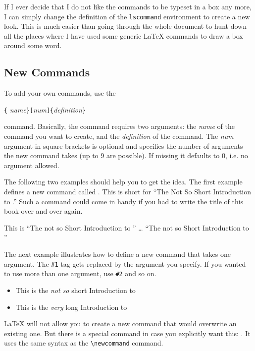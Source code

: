 If I ever decide that I do not like the commands to be typeset in
a box any more, I can simply change the definition of the
\texttt{lscommand} environment to create a new look. This is much
easier than going through the whole document to hunt down all the
places where I have used some generic \LaTeX{} commands to draw a
box around some word. 


\subsection{New Commands}

To add your own commands, use the
\begin{lscommand}
\verb|{|%
       \emph{name}\verb|}[|\emph{num}\verb|]{|\emph{definition}\verb|}|
\end{lscommand}
\noindent command. 
Basically, the command requires two arguments: the \emph{name} of the
command you want to create, and the \emph{definition} of the command.
The \emph{num} argument in square brackets is optional and specifies the number
of arguments the new command takes (up to 9 are possible).
If missing it defaults to 0, i.e. no argument allowed.

The following two examples should help you to get the idea.
The first example defines a new command called . This is
short for ``The Not So Short Introduction to \LaTeXe.'' Such a command
could come in handy if you had to write the title of this book over 
and over again. 

\begin{example}
\newcommand{\tnss}{The not
    so Short Introduction to
    \LaTeXe}
This is ``\tnss'' \ldots{} 
``\tnss''
\end{example}

The next example illustrates how to define a new
command that takes one argument.
The \verb|#1| tag gets replaced by the argument you specify.
If you wanted to use more than one argument, use \verb|#2| and
so on.

\begin{example}
\newcommand{\txsit}[2]
 {This is the \emph{#1} 
  #2 Introduction to \LaTeXe}
\begin{itemize}
\item \txsit{not so}{short}
\item \txsit{very}{long}
\end{itemize}
\end{example}

\LaTeX{} will not allow you to create a new command that would
overwrite an existing one. But there is a special command in case you
explicitly want this: .
It uses the same syntax as the \verb|\newcommand|
command.

